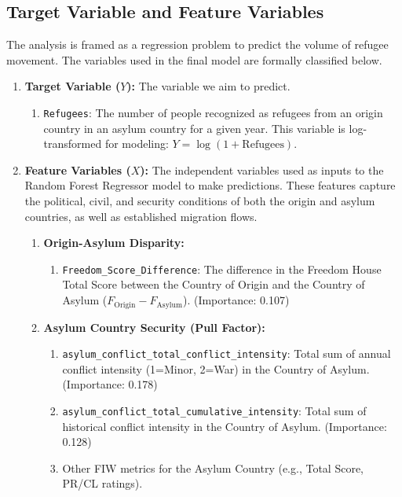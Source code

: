 \documentclass{article}
\theoremstyle{plain}
\theoremstyle{definition}
\theoremstyle{remark}
\begin{document}
\subsection{Target Variable and Feature Variables}

The analysis is framed as a regression problem to predict the volume of refugee movement. The variables used in the final model are formally classified below.

\begin{enumerate}
    \item \textbf{Target Variable ($Y$):} The variable we aim to predict.
    \begin{enumerate}
        \item \texttt{Refugees}: The number of people recognized as refugees from an origin country in an asylum country for a given year. This variable is log-transformed for modeling: $Y = \log(1 + \text{Refugees})$.
    \end{enumerate}
    \item \textbf{Feature Variables ($X$):} The independent variables used as inputs to the Random Forest Regressor model to make predictions. These features capture the political, civil, and security conditions of both the origin and asylum countries, as well as established migration flows.
    \begin{enumerate}
        \item \textbf{Origin-Asylum Disparity:}
        \begin{enumerate}
            \item \texttt{Freedom\_Score\_Difference}: The difference in the Freedom House Total Score between the Country of Origin and the Country of Asylum ($F_{\text{Origin}} - F_{\text{Asylum}}$). (Importance: 0.107)
        \end{enumerate}
        \item \textbf{Asylum Country Security (Pull Factor):}
        \begin{enumerate}
            \item \texttt{asylum\allowbreak\_conflict\allowbreak\_total\allowbreak\_conflict\allowbreak\_intensity}: Total sum of annual conflict intensity (1=Minor, 2=War) in the Country of Asylum. (Importance: 0.178)
            \item \texttt{asylum\allowbreak\_conflict\allowbreak\_total\allowbreak\_cumulative\allowbreak\_intensity}: Total sum of historical conflict intensity in the Country of Asylum. (Importance: 0.128)
            \item Other FIW metrics for the Asylum Country (e.g., Total Score, PR/CL ratings).

\end{enumerate}
\end{enumerate}
\end{enumerate}
\end{document}
